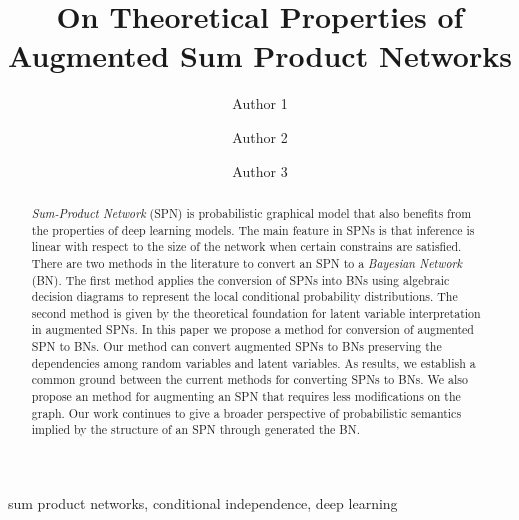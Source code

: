 \documentclass[runningheads,a4paper]{llncs}
\newcommand{\keywords}[1]{\par\addvspace\baselineskip
\noindent\keywordname\enspace\ignorespaces#1}
\begin{document}
\mainmatter
\title{On Theoretical Properties of \\ Augmented Sum Product Networks}

\author{
Author 1 
\and
Author 2 
\and 
Author 3 
}


\maketitle



\begin{abstract}
\emph{Sum-Product Network} (SPN) is probabilistic graphical model that also benefits from the properties of deep learning models.
The main feature in SPNs is that inference is linear with respect to the size of the network when certain constrains are satisfied.
There are two methods in the literature to convert an SPN to a \emph{Bayesian Network} (BN).
The first method applies the conversion of SPNs into BNs using algebraic decision diagrams to represent the local conditional probability distributions.
The second method is given by the theoretical foundation for latent variable interpretation in augmented SPNs.
In this paper we propose a method for conversion of augmented SPN to BNs.
Our method can convert augmented SPNs to BNs preserving the dependencies among random variables and latent variables.
As results, we establish a common ground between the current methods for converting SPNs to BNs.
We also propose an method for augmenting an SPN that requires less modifications on the graph.
Our work continues to give a broader perspective of probabilistic semantics implied by the structure of an SPN through generated the BN.
\end{abstract}

\keywords{sum product networks, conditional independence, deep learning}










\end{document}
